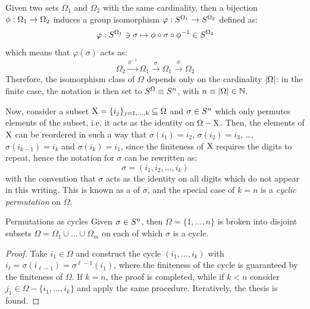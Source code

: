 Given two sets $ \Omega_1 $ and $ \Omega_2 $ with the same cardinality, then a bijection $ \phi : \Omega_1 \rightarrow \Omega_2 $ induces a group isomorphism $ \varphi : S^{\Omega_1} \rightarrow S^{\Omega_2} $ defined as:
\begin{equation}
  \varphi : S^{\Omega_1} \ni \sigma \mapsto \phi \circ \sigma \circ \phi^{-1} \in S^{\Omega_2}
\end{equation}
which means that $ \varphi(\sigma) $ acts as:
\begin{equation*}
  \Omega_2 \xrightarrow{\phi^{-1}} \Omega_1 \xrightarrow{\ \sigma \ } \Omega_1 \xrightarrow{\ \phi \ } \Omega_2
\end{equation*}
Therefore, the isomorphism class of $ \Omega $ depends only on the cardinality $ \left\lvert\Omega\right\rvert $: in the finite case, the notation is then set to $ S^{\Omega} \equiv S^{n} $, with $ n \equiv \left\lvert\Omega\right\rvert \in \mathbb{N} $.

Now, consider a subset $ \mathrm{X} = \{i_j\}_{j = 1, \dots, k} \subseteq \Omega $ and $ \sigma \in S^{n} $ which only permutes elements of the subset, i.e. it acts as the identity on $ \Omega - \mathrm{X} $. Then, the elements of $ \mathrm{X} $ can be reordered in such a way that $ \sigma(i_1) = i_2 $, $ \sigma(i_2) = i_3 $, \dots, $ \sigma(i_{k-1}) = i_k $ and $ \sigma(i_k) = i_1 $, since the finiteness of $ \mathrm{X} $ requires the digits to repeat, hence the notation for $ \sigma $ can be rewritten as:
\begin{equation*}
  \sigma = (i_1 , i_2, \dots, i_k)
\end{equation*}
with the convention that $ \sigma $ acts as the identity on all digits which do not appear in this writing. This is known as a  of $ \sigma $, and the special case of $ k = n $ is a \emph{cyclic permutation} on $ \Omega $.

\begin{proposition}{Permutations as cycles}{}
  Given $ \sigma \in S^{n} $, then $ \Omega = \{1, \dots, n\} $ is broken into disjoint subsets $ \Omega = \Omega_1 \cup \dots \cup \Omega_m $ on each of which $ \sigma $ is a cycle.
\end{proposition}

\begin{proofbox}
  \begin{proof}
    Take $ i_1 \in \Omega $ and construct the cycle $ (i_1 , \dots , i_k) $ with $ i_\ell = \sigma(i_{\ell-1}) = \sigma^{\ell-1}(i_1) $, where the finiteness of the cycle is guaranteed by the finiteness of $ \Omega $. If $ k = n $, the proof is completed, while if $ k < n $ consider $ j_1 \in \Omega - \{i_1 , \dots , i_k\} $ and apply the same procedure. Iteratively, the thesis is found.
  \end{proof}
\end{proofbox}

